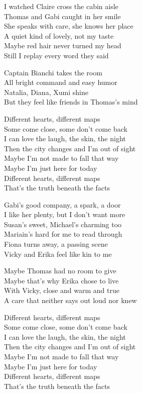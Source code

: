 \begin{lyrics}
I watched Claire cross the cabin aisle\\
Thomas and Gabi caught in her smile\\
She speaks with care, she knows her place\\
A quiet kind of lovely, not my taste\\
Maybe red hair never turned my head\\
Still I replay every word they said

Captain Bianchi takes the room\\
All bright command and easy humor\\
Natalia, Diana, Xumi shine\\
But they feel like friends in Thomas’s mind

Different hearts, different maps\\
Some come close, some don’t come back\\
I can love the laugh, the skin, the night\\
Then the city changes and I’m out of sight\\
Maybe I’m not made to fall that way\\
Maybe I’m just here for today\\
Different hearts, different maps\\
That’s the truth beneath the facts

Gabi’s good company, a spark, a door\\
I like her plenty, but I don’t want more\\
Susan’s sweet, Michael’s charming too\\
Mariain’s hard for me to read through\\
Fiona turns away, a passing scene\\
Vicky and Erika feel like kin to me

Maybe Thomas had no room to give\\
Maybe that’s why Erika chose to live\\
With Vicky, close and warm and true\\
A care that neither says out loud nor knew

Different hearts, different maps\\
Some come close, some don’t come back\\
I can love the laugh, the skin, the night\\
Then the city changes and I’m out of sight\\
Maybe I’m not made to fall that way\\
Maybe I’m just here for today\\
Different hearts, different maps\\
That’s the truth beneath the facts


\end{lyrics}

